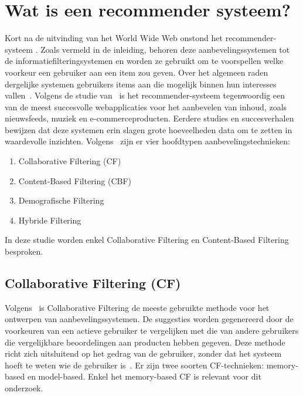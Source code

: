 \section{Wat is een recommender systeem?}
Kort na de uitvinding van het World Wide Web onstond het recommender-systeem \autocite{Dong2022}. Zoals vermeld in de inleiding, behoren deze aanbevelingssystemen tot de informatiefilteringsystemen en worden ze gebruikt om te voorspellen welke voorkeur een gebruiker aan een item zou geven. Over het algemeen raden dergelijke systemen gebruikers items aan die mogelijk binnen hun interesses vallen~\autocite{Thorat2015}. Volgens de studie van~\textcite{Dong2022} is het recommender-systeem tegenwoordig een van de meest succesvolle webapplicaties voor het aanbevelen van inhoud, zoals nieuwsfeeds, muziek en e-commerceproducten. Eerdere studies en succesverhalen bewijzen dat deze systemen erin slagen grote hoeveelheden data om te zetten in waardevolle inzichten. Volgens~\textcite{Thorat2015} zijn er vier hoofdtypen aanbevelingstechnieken:
\begin{enumerate}
    \item Collaborative Filtering (CF)
    \item Content-Based Filtering (CBF)
    \item Demografische Filtering
    \item Hybride Filtering
\end{enumerate}
In deze studie worden enkel Collaborative Filtering en Content-Based Filtering besproken.

\subsection{Collaborative Filtering (CF)}
Volgens~\textcite{Thorat2015} is Collaborative Filtering de meeste gebruikte methode voor het ontwerpen van aanbevelingssystemen. De suggesties worden gegenereerd door de voorkeuren van een actieve gebruiker te vergelijken met die van andere gebruikers die vergelijkbare beoordelingen aan producten hebben gegeven. Deze methode richt zich uitsluitend op het gedrag van de gebruiker, zonder dat het systeem hoeft te weten wie de gebruiker is~\autocite{Koren2021}.
Er zijn twee soorten CF-technieken: memory-based en model-based. Enkel het memory-based CF is relevant voor dit onderzoek.

